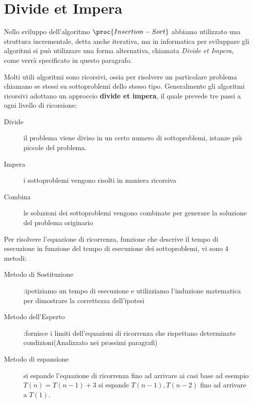 \chapter{Divide et Impera}
Nello sviluppo dell'algoritmo $\proc{Insertion-Sort}$ abbiamo utilizzato una
struttura incrementale, detta anche iterativa, ma in informatica per sviluppare
gli algoritmi si può utilizzare una forma alternativa, chiamata \emph{Divide et Impera},
come verrà specificato in questo paragrafo.

Molti utili algoritmi sono ricorsivi, ossia per risolvere un particolare problema
chiamano se stessi su sottoproblemi dello stesso tipo.
Generalmente gli algoritmi ricorsivi adottano un approccio \textbf{divide et impera},
il quale prevede tre passi a ogni livello di ricorsione:
\begin{description}
    \item[Divide]il problema viene diviso in un certo numero di sottoproblemi, istanze
                  più piccole del problema.
    \item[Impera]i sottoproblemi vengono risolti in maniera ricorsiva
    \item[Combina]le soluzioni dei sottoproblemi vengono combinate per generare
                   la soluzione del problema originario
\end{description}


Per risolvere l'equazione di ricorrenza, funzione che descrive il tempo di esecuzione
in funzione del tempo di esecuzione dei sottoproblemi, vi sono 4 metodi:
\begin{description}
    \item[Metodo di Sostituzione]:ipotiziamo un tempo di esecuzione e utilizziamo
                l'induzione matematica per dimostrare la correttezza dell'ipotesi
    \item[Metodo dell'Esperto]:fornisce i limiti dell'equazioni di ricorrenza che
          rispettano determinate condizioni(Analizzato nei prossimi paragrafi)
    \item[Metodo di espansione] si espande l'equazione di ricorrenza fino ad arrivare ai casi base
          ad esempio $T(n) = T(n-1) + 3$ si espande $T(n-1),T(n-2)$ fino ad arrivare a $T(1)$.
\end{description}


